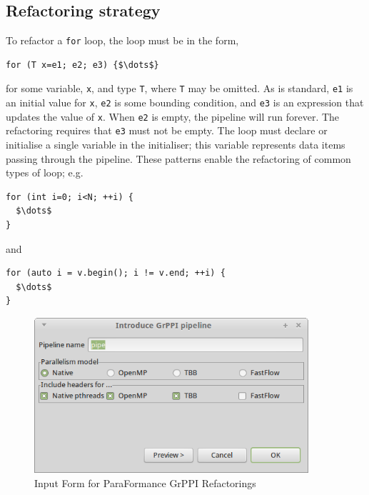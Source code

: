 \subsection{Refactoring strategy}\label{refactoring-strategy}

To refactor a \texttt{for} loop, the loop must be in the form,
% 
\begin{lstlisting}[mathescape]
for (T x=e1; e2; e3) {$\dots$}
\end{lstlisting}

\noindent
for some variable, \texttt{x}, and type \texttt{T}, where \texttt{T} may be omitted.
As is standard,
\texttt{e1} is an initial value for \texttt{x}, \texttt{e2} is some
bounding condition, and \texttt{e3} is an expression that updates the
value of \texttt{x}. When \texttt{e2} is empty, the
pipeline will run forever. The refactoring requires that \texttt{e3} must not be empty. The
loop must declare or initialise a
single variable in the initialiser; this variable represents data
items passing through the pipeline.
% 
These patterns enable the refactoring of common types of loop; e.g.
\begin{lstlisting}[mathescape]
for (int i=0; i<N; ++i) {
  $\dots$
}
\end{lstlisting}

\noindent
and
\begin{lstlisting}[mathescape]
for (auto i = v.begin(); i != v.end; ++i) {
  $\dots$
}
\end{lstlisting}

\begin{figure}
\centering
\includegraphics[width=4in]{figures/InputForm.png}
\caption{Input Form for ParaFormance GrPPI Refactorings}
\label{fig:inputform}
\end{figure}

